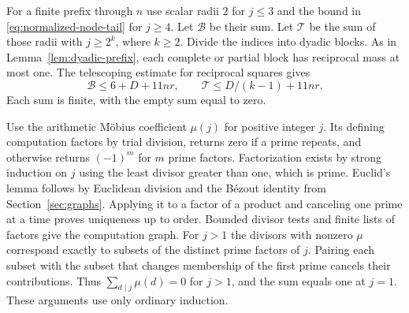 \documentclass[11pt]{amsart}
\theoremstyle{definition}
\theoremstyle{remark}
\numberwithin{equation}{section}
\begin{document}
For a finite prefix through $n$ use scalar radii $2$ for
$j\le3$ and the bound in \eqref{eq:normalized-node-tail}
for $j\ge4$. Let $\mathcal B$ be their sum. Let
$\mathcal T$ be the sum of those radii with $j\ge2^k$,
where $k\ge2$. Divide the indices into dyadic blocks.
As in Lemma~\ref{lem:dyadic-prefix}, each complete or partial
block has reciprocal mass at most one. The telescoping estimate
for reciprocal squares gives
\[
 \mathcal B\le6+D+11nr,\qquad
 \mathcal T\le D/(k-1)+11nr.
\]
Each sum is finite, with the empty sum equal to zero.

Use the arithmetic Möbius coefficient $\mu(j)$ for positive
integer $j$. Its defining computation factors by trial division,
returns zero if a prime repeats, and otherwise returns $(-1)^m$
for $m$ prime factors. Factorization exists by strong induction
on $j$ using the least divisor greater than one, which is prime.
Euclid's lemma follows by Euclidean division and the Bézout
identity from Section~\ref{sec:graphs}. Applying it to a factor
of a product and canceling one prime at a time proves uniqueness
up to order. Bounded divisor tests and finite lists of factors
give the computation graph. For $j>1$ the divisors with
nonzero $\mu$ correspond exactly to subsets of the distinct
prime factors of $j$. Pairing each subset with the subset that
changes membership of the first prime cancels their contributions.
Thus $\sum_{d\mid j}\mu(d)=0$ for $j>1$, and the sum equals one
at $j=1$. These arguments use only ordinary induction.
\end{document}
